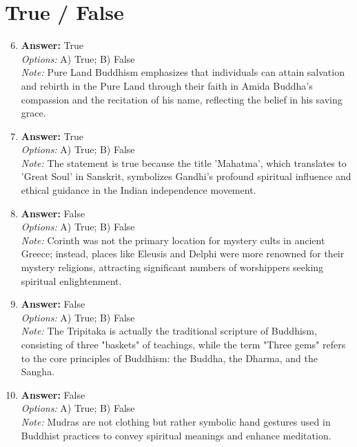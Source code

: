 \documentclass[12pt]{article}
\begin{document}
\section*{True / False}
\begin{enumerate}[label=\arabic*.]
\setcounter{enumi}{5}
\item \textbf{Answer:} True
\\ \textit{Options:} A) True; B) False
\\ \textit{Note:} Pure Land Buddhism emphasizes that individuals can attain salvation and rebirth in the Pure Land through their faith in Amida Buddha's compassion and the recitation of his name, reflecting the belief in his saving grace.
\item \textbf{Answer:} True
\\ \textit{Options:} A) True; B) False
\\ \textit{Note:} The statement is true because the title 'Mahatma', which translates to 'Great Soul' in Sanskrit, symbolizes Gandhi's profound spiritual influence and ethical guidance in the Indian independence movement.
\item \textbf{Answer:} False
\\ \textit{Options:} A) True; B) False
\\ \textit{Note:} Corinth was not the primary location for mystery cults in ancient Greece; instead, places like Eleusis and Delphi were more renowned for their mystery religions, attracting significant numbers of worshippers seeking spiritual enlightenment.
\item \textbf{Answer:} False
\\ \textit{Options:} A) True; B) False
\\ \textit{Note:} The Tripitaka is actually the traditional scripture of Buddhism, consisting of three "baskets" of teachings, while the term "Three gems" refers to the core principles of Buddhism: the Buddha, the Dharma, and the Sangha.
\item \textbf{Answer:} False
\\ \textit{Options:} A) True; B) False
\\ \textit{Note:} Mudras are not clothing but rather symbolic hand gestures used in Buddhist practices to convey spiritual meanings and enhance meditation.
\end{enumerate}
\end{document}
